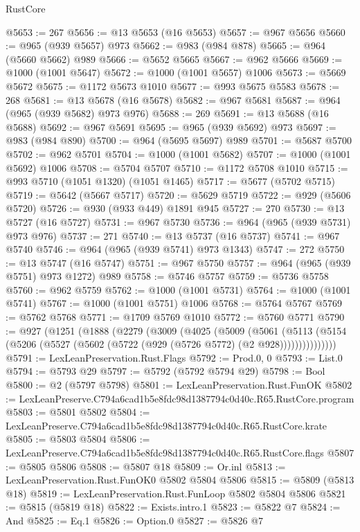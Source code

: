 \begin{lexlean}{RustCore}
\begin{coremodule}
@5653 := 267
@5656 := @13 @5653 (@16 @5653)
@5657 := @967 @5656
@5660 := @965 (@939 @5657) @973
@5662 := @983 (@984 @878)
@5665 := @964 (@5660 @5662) @989
@5666 := @5652 @5665
@5667 := @962 @5666
@5669 := @1000 (@1001 @5647)
@5672 := @1000 (@1001 @5657) @1006
@5673 := @5669 @5672
@5675 := @1172 @5673 @1010
@5677 := @993 @5675 @5583
@5678 := 268
@5681 := @13 @5678 (@16 @5678)
@5682 := @967 @5681
@5687 := @964 (@965 (@939 @5682) @973 @976)
@5688 := 269
@5691 := @13 @5688 (@16 @5688)
@5692 := @967 @5691
@5695 := @965 (@939 @5692) @973
@5697 := @983 (@984 @890)
@5700 := @964 (@5695 @5697) @989
@5701 := @5687 @5700
@5702 := @962 @5701
@5704 := @1000 (@1001 @5682)
@5707 := @1000 (@1001 @5692) @1006
@5708 := @5704 @5707
@5710 := @1172 @5708 @1010
@5715 := @993 @5710 (@1051 @1320) (@1051 @1465)
@5717 := @5677 (@5702 @5715)
@5719 := @5642 (@5667 @5717)
@5720 := @5629 @5719
@5722 := @929 (@5606 @5720)
@5726 := @930 (@933 @449) @1891 @945
@5727 := 270
@5730 := @13 @5727 (@16 @5727)
@5731 := @967 @5730
@5736 := @964 (@965 (@939 @5731) @973 @976)
@5737 := 271
@5740 := @13 @5737 (@16 @5737)
@5741 := @967 @5740
@5746 := @964 (@965 (@939 @5741) @973 @1343)
@5747 := 272
@5750 := @13 @5747 (@16 @5747)
@5751 := @967 @5750
@5757 := @964 (@965 (@939 @5751) @973 @1272) @989
@5758 := @5746 @5757
@5759 := @5736 @5758
@5760 := @962 @5759
@5762 := @1000 (@1001 @5731)
@5764 := @1000 (@1001 @5741)
@5767 := @1000 (@1001 @5751) @1006
@5768 := @5764 @5767
@5769 := @5762 @5768
@5771 := @1709 @5769 @1010
@5772 := @5760 @5771
@5790 := @927
    (@1251
      (@1888
        (@2279
          (@3009
            (@4025
              (@5009
                (@5061
                  (@5113
                    (@5154 (@5206 (@5527 (@5602 (@5722 (@929 (@5726 @5772) (@2 @928)))))))))))))))
@5791 := LexLeanPreservation.Rust.Flags
@5792 := Prod.{0, 0}
@5793 := List.{0}
@5794 := @5793 @29
@5797 := @5792 (@5792 @5794 @29)
@5798 := Bool
@5800 := @2 (@5797 @5798)
@5801 := LexLeanPreservation.Rust.FunOK
@5802 := LexLeanPreserve.C794a6cad1b5e8fdc98d1387794c0d40c.R65.RustCore.program
@5803 := @5801 @5802
@5804 := LexLeanPreserve.C794a6cad1b5e8fdc98d1387794c0d40c.R65.RustCore.krate
@5805 := @5803 @5804
@5806 := LexLeanPreserve.C794a6cad1b5e8fdc98d1387794c0d40c.R65.RustCore.flags
@5807 := @5805 @5806
@5808 := @5807 @18
@5809 := Or.inl
@5813 := LexLeanPreservation.Rust.FunOK0 @5802 @5804 @5806
@5815 := @5809 (@5813 @18)
@5819 := LexLeanPreservation.Rust.FunLoop @5802 @5804 @5806
@5821 := @5815 (@5819 @18)
@5822 := Exists.intro.{1}
@5823 := @5822 @7
@5824 := And
@5825 := Eq.{1}
@5826 := Option.{0}
@5827 := @5826 @7

\end{coremodule}
\end{lexlean}
